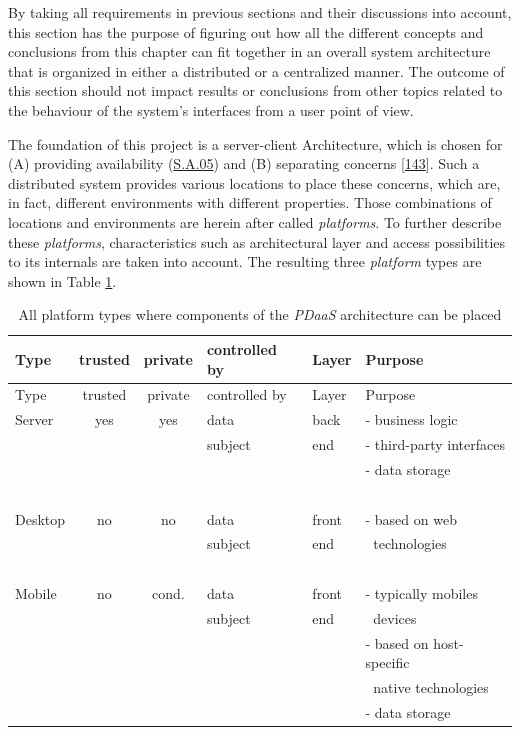 \documentclass[12pt,english,a4paper,titlepage,cleardoublepage=empty,dottedtoc]{report}
\begin{document}
By taking all requirements in previous sections and their discussions
into account, this section has the purpose of figuring out how all the
different concepts and conclusions from this chapter can fit together in
an overall system architecture that is organized in either a distributed
or a centralized manner. The outcome of this section should not impact
results or conclusions from other topics related to the behaviour of the
system's interfaces from a user point of view.

The foundation of this project is a server-client Architecture, which is
chosen for (A) providing availability (\protect\hyperlink{sa05}{S.A.05})
and (B) separating concerns
{[}\protect\hyperlink{ref-web_2016_wikipedia_separation-of-concerns}{143}{]}.
Such a distributed system provides various locations to place these
concerns, which are, in fact, different environments with different
properties. Those combinations of locations and environments are herein
after called \emph{platforms}. To further describe these
\emph{platforms}, characteristics such as architectural layer and access
possibilities to its internals are taken into account. The resulting
three \emph{platform} types are shown in Table
\ref{tbl:platforms-characteristics}.

\begin{longtable}[]{@{}lcclll@{}}
\caption{All platform types where components of the \emph{PDaaS}
architecture can be placed
\label{tbl:platforms-characteristics}}\tabularnewline
\toprule
Type & trusted & private & controlled by & Layer &
Purpose\tabularnewline
\midrule
\endfirsthead
\toprule
Type & trusted & private & controlled by & Layer &
Purpose\tabularnewline
\midrule
\endhead
Server & yes & yes & data & back & - business logic\tabularnewline
\(\ \) & \(\ \) & \(\ \) & subject & end & - third-party
interfaces\tabularnewline
\(\ \) & \(\ \) & \(\ \) & \(\ \) & \(\ \) & - data
storage\tabularnewline
\(\ \) & \(\ \) & \(\ \) & \(\ \) & \(\ \) & \(\ \)\tabularnewline
Desktop & no & no & data & front & - based on web\tabularnewline
\(\ \) & \(\ \) & \(\ \) & subject & end & \(\ \)
technologies\tabularnewline
\(\ \) & \(\ \) & \(\ \) & \(\ \) & \(\ \) & \(\ \)\tabularnewline
Mobile & no & cond. & data & front & - typically mobiles\tabularnewline
\(\ \) & \(\ \) & \(\ \) & subject & end & \(\ \) devices\tabularnewline
\(\ \) & \(\ \) & \(\ \) & \(\ \) & \(\ \) & - based on
host-specific\tabularnewline
\(\ \) & \(\ \) & \(\ \) & \(\ \) & \(\ \) & \(\ \) native
technologies\tabularnewline
\(\ \) & \(\ \) & \(\ \) & \(\ \) & \(\ \) & - data
storage\tabularnewline
\bottomrule
\end{longtable}
\end{document}
